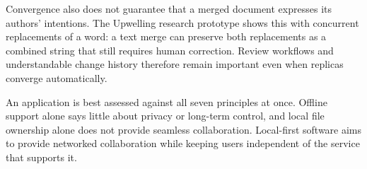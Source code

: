 Convergence also does not guarantee that a merged document expresses its authors' intentions.
The Upwelling research prototype shows this with concurrent replacements of a word: a text merge can preserve both replacements as a combined string that still requires human correction.
Review workflows and understandable change history therefore remain important even when replicas converge automatically.
\parencite{upwelling}

An application is best assessed against all seven principles at once.
Offline support alone says little about privacy or long-term control, and local file ownership alone does not provide seamless collaboration.
Local-first software aims to provide networked collaboration while keeping users independent of the service that supports it.
\parencite{local-first-software}
